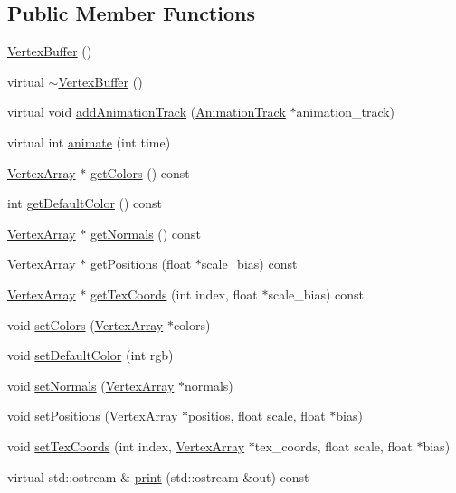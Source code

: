 \subsection*{Public Member Functions}
\begin{CompactItemize}
\item 
\hyperlink{classm3g_1_1VertexBuffer_fd7b13840c99c57d27316c8f8434dc49}{VertexBuffer} ()
\item 
virtual \hyperlink{classm3g_1_1VertexBuffer_0e5e1dbdc4295ff9aa1e15e0ce3624af}{$\sim$VertexBuffer} ()
\item 
virtual void \hyperlink{classm3g_1_1VertexBuffer_415c0b110f95410ded9b85e5d99a496b}{addAnimationTrack} (\hyperlink{classm3g_1_1AnimationTrack}{AnimationTrack} $\ast$animation\_\-track)
\item 
virtual int \hyperlink{classm3g_1_1VertexBuffer_82cfeb67ca66b93e2ca7bda9a4f0e2aa}{animate} (int time)
\item 
\hyperlink{classm3g_1_1VertexArray}{VertexArray} $\ast$ \hyperlink{classm3g_1_1VertexBuffer_e3bdc8503242a6d278230352d03e5893}{getColors} () const 
\item 
int \hyperlink{classm3g_1_1VertexBuffer_4e33b93a98ce0632d51e7ae775ae5b1e}{getDefaultColor} () const 
\item 
\hyperlink{classm3g_1_1VertexArray}{VertexArray} $\ast$ \hyperlink{classm3g_1_1VertexBuffer_0f4341d1215ff8f4efeaa40a21327c0c}{getNormals} () const 
\item 
\hyperlink{classm3g_1_1VertexArray}{VertexArray} $\ast$ \hyperlink{classm3g_1_1VertexBuffer_5ca059361f9f834dd00b5d595bf3df0b}{getPositions} (float $\ast$scale\_\-bias) const 
\item 
\hyperlink{classm3g_1_1VertexArray}{VertexArray} $\ast$ \hyperlink{classm3g_1_1VertexBuffer_9015840c09da0691c31a8aab5e09404a}{getTexCoords} (int index, float $\ast$scale\_\-bias) const 
\item 
void \hyperlink{classm3g_1_1VertexBuffer_e5a5933252e3ec3afa0a83698b5b3521}{setColors} (\hyperlink{classm3g_1_1VertexArray}{VertexArray} $\ast$colors)
\item 
void \hyperlink{classm3g_1_1VertexBuffer_ba88996ea63221b09b9f841aef0270ee}{setDefaultColor} (int rgb)
\item 
void \hyperlink{classm3g_1_1VertexBuffer_4aabe6277538d5aa8285759dab85002a}{setNormals} (\hyperlink{classm3g_1_1VertexArray}{VertexArray} $\ast$normals)
\item 
void \hyperlink{classm3g_1_1VertexBuffer_527460407f488d5128bae7d0adb6da43}{setPositions} (\hyperlink{classm3g_1_1VertexArray}{VertexArray} $\ast$positios, float scale, float $\ast$bias)
\item 
void \hyperlink{classm3g_1_1VertexBuffer_9fd3dd3f78138d654d18863e4f1329f4}{setTexCoords} (int index, \hyperlink{classm3g_1_1VertexArray}{VertexArray} $\ast$tex\_\-coords, float scale, float $\ast$bias)
\item 
virtual std::ostream \& \hyperlink{classm3g_1_1VertexBuffer_6fea17fa1532df3794f8cb39cb4f911f}{print} (std::ostream \&out) const 
\end{CompactItemize}
